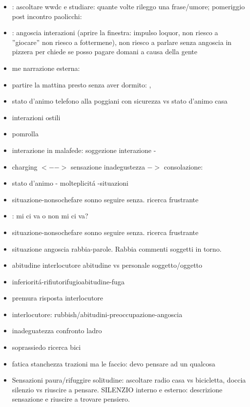\begin{itemize}
\item {}: ascoltare wwdc e studiare: quante volte rileggo una frase/umore; pomeriggio post incontro paolicchi:
\item {}: angoscia interazioni (aprire la finestra: impulso loquor, non riesco a ''giocare'' non riesco a fottermene), non riesco a parlare senza angoscia in pizzera per chiede se posso pagare domani a causa della gente
\item me narrazione esterna: 
\item partire la mattina presto senza aver dormito:  , 
\item stato d'animo telefono alla poggiani con sicurezza vs stato d'animo casa
\item interazioni ostili
\item pomrolla
\item interazione in malafede: soggezione interazione - 
\item charging $<-->$ sensazione inadegustezza $->$ consolazione:  
\item stato d'animo - molteplicit\'a -situazioni
\item situazione-nonsochefare sonno seguire senza. ricerca frustrante
\item {}: mi ci va o non mi ci va?
\item situazione-nonsochefare sonno seguire senza. ricerca frustrante
\item situazione angoscia rabbia-parole.
Rabbia commenti soggetti in torno.
\item abitudine interlocutore abitudine vs personale soggetto/oggetto
\item inferiorit\'a-rifiutorifugioabitudine-fuga
\item premura risposta interlocutore
\item interlocutore: rubbish/abitudini-preoccupazione-angoscia
\item inadeguatezza confronto ladro
\item soprassiedo ricerca bici
\item fatica stanchezza trazioni ma le faccio: devo pensare ad un qualcosa
\item Sensazioni paura/rifuggire solitudine: ascoltare radio casa vs bicicletta, doccia silenzio vs riuscire a pensare. SILENZIO interno e esterno: descrizione sensazione e riuscire a trovare pensiero.
\end{itemize}

